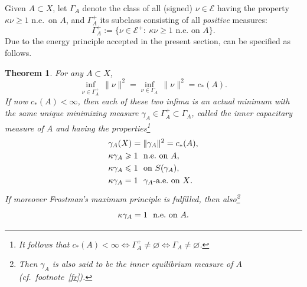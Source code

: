 \documentclass[12pt,a4paper,reqno]{amsart} %
\theoremstyle{lause}
\theoremstyle{maaritelma}
\theoremstyle{lause}
\newtheorem{theorem}{Theorem}[section]
\theoremstyle{maaritelma}
\numberwithin{equation}{section}
\begin{document}
Given $A\subset X$, let $\Gamma_A$ denote the class of all (signed) $\nu\in\mathcal E$ having the property $\kappa\nu\geqslant1$ n.e.\ on $A$, and $\Gamma_A^+$ its subclass consisting of all {\it positive\/} measures:
\begin{equation}\label{def-in}\Gamma_A^+:=\bigl\{\nu\in\mathcal E^+: \ \kappa\nu\geqslant1\text{ \ n.e.\ on $A$}\bigr\}.\end{equation}
Due to the energy principle accepted in the present section, \cite[Theorem~4.1]{F1} can be specified as follows.

\begin{theorem}\label{prop.1.2'}For any\/ $A\subset X$,
\begin{equation*}\label{I}\inf_{\nu\in\Gamma_A^+}\,\|\nu\|^2=\inf_{\nu\in\Gamma_A}\,\|\nu\|^2=c_*(A).\end{equation*}
If now\/ $c_*(A)<\infty$, then each of these two infima is an actual minimum with the same unique minimizing measure\/ $\gamma_A\in\Gamma_A^+\subset\Gamma_A$, called the inner capacitary measure of\/ $A$ and having the properties\/\footnote{It follows that $c_*(A)<\infty\iff\Gamma_A^+\ne\varnothing\iff\Gamma_A\ne\varnothing$.\label{f5}}
\begin{align}
\label{pr1}&\gamma_A(X)=\|\gamma_A\|^2=c_*(A),\\
\label{pr0}&\kappa\gamma_A\geqslant1\text{ \ n.e.\ on\/ $A$},\\
\label{pr2}&\kappa\gamma_A\leqslant1\text{ \ on\/ $S(\gamma_A)$},\\
\label{pr3}&\kappa\gamma_A=1\text{ \ $\gamma_A$-a.e.\ on\/ $X$.}\end{align}
If moreover Frostman's maximum principle is fulfilled, then also\/\footnote{Then $\gamma_A$ is also said to be the inner {\it equilibrium\/} measure of $A$ (cf.\ footnote~\ref{fr}).}
\begin{equation}\label{F}\kappa\gamma_A=1\text{ \ n.e.\ on\/ $A$.}\end{equation}
\end{theorem}
\end{document}

